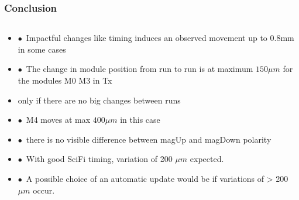 \documentclass[aspectratio=1610, 12pt]{beamer}
\begin{document}

\begin{frame}\frametitle{Conclusion}
  \begin{columns}
    \begin{column}[c]{\textwidth}
      \begin{itemize}
        \item $\bullet$\, Impactful changes like timing induces an observed movement up to 0.8mm in some cases
        \item $\bullet$\, The change in module position from run to run is at maximum $150 \mu m$ for the modules M0 \to M3 in Tx
        \item \to only if there are no big changes between runs
        \item $\bullet$\, M4 moves at max $400 \mu m$ in this case
        \item $\bullet$\, there is no visible difference between magUp and magDown polarity
        \item $\bullet$\, With good SciFi timing, variation of 200 $\mu m$ expected.
        \item $\bullet$\, A possible choice of an automatic update would be if variations of > 200 $\mu m$ occur.
      \end{itemize}
    \end{column}
  \end{columns}
\end{frame}
\end{document}
